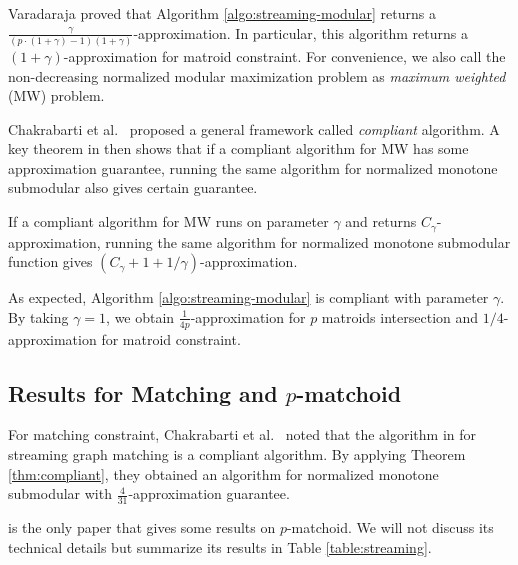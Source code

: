Varadaraja proved that Algorithm \ref{algo:streaming-modular} returns a $\frac{\gamma}{(p\cdot (1 + \gamma) - 1)(1 + \gamma)}$-approximation. In particular, this algorithm returns a $(1 + \gamma)$-approximation for matroid constraint. For convenience, we also call the non-decreasing normalized modular maximization
problem as \emph{maximum weighted} (MW) problem. 

Chakrabarti et al.\ \cite{CK14} proposed a general framework called \emph{compliant} algorithm. A key theorem in \cite{CK14} then shows that if a compliant algorithm for MW has some approximation guarantee, running the same algorithm for normalized monotone submodular also gives certain guarantee.
\begin{theorem}[Informal]
  \label{thm:compliant}
  If a compliant algorithm for MW runs on parameter $\gamma$ and returns $C_{\gamma}$-approximation, running the same algorithm for normalized monotone submodular function gives $(C_{\gamma} + 1 + 1/\gamma)$-approximation.
\end{theorem}

As expected, Algorithm \ref{algo:streaming-modular} is compliant with parameter $\gamma$. By taking $\gamma = 1$, we obtain $\frac{1}{4p}$-approximation for $p$ matroids intersection and $1/4$-approximation for matroid constraint.










\subsection{Results for Matching and $p$-matchoid}
For matching constraint, Chakrabarti et al.\ \cite{CK14} noted that the algorithm in \cite{Z12} for streaming graph matching is a compliant algorithm. By applying Theorem \ref{thm:compliant}, they obtained an algorithm for normalized monotone submodular with $\frac{4}{31}$-approximation guarantee.

\cite{CGQ15} is the only paper that gives some results on $p$-matchoid. We will not discuss its technical details but summarize its results in Table \ref{table:streaming}.